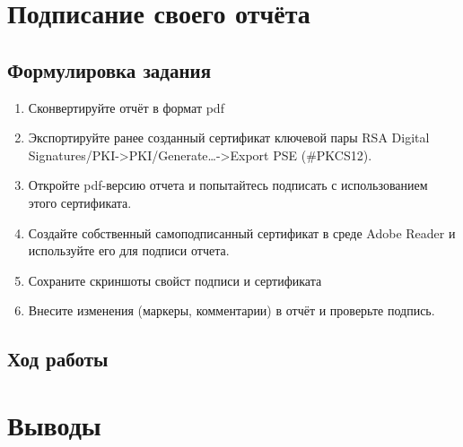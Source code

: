 \documentclass[a4paper, 14pt]{extarticle}
\begin{document}
\section{Подписание своего отчёта}
\subsection{Формулировка задания}
\begin{enumerate}
    \item Сконвертируйте отчёт в формат pdf
    \item Экспортируйте ранее созданный сертификат ключевой пары RSA Digital Signatures/PKI->PKI/Generate…->Export PSE (\#PKCS12).
    \item Откройте pdf-версию отчета и попытайтесь подписать с использованием этого сертификата.
    \item Создайте собственный самоподписанный сертификат в среде Adobe Reader и используйте его для подписи отчета.
    \item Сохраните скриншоты свойст подписи и сертификата
    \item Внесите изменения (маркеры, комментарии) в отчёт и проверьте подпись.
\end{enumerate}

\subsection{Ход работы}
\lipsum[1] %

\clearpage
\section{Выводы}
\lipsum[1] %
\end{document}
